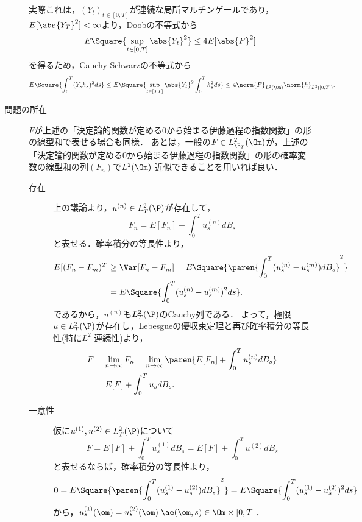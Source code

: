 \documentclass[uplatex,dvipdfmx]{jsreport}
\begin{document}
\begin{Proof}
\begin{description}
        実際これは，$(Y_t)_{t\in[0,T]}$が連続な局所マルチンゲールであり，$E[\abs{Y_T}^2]<\infty$より，Doobの不等式から
        \[E\Square{\sup_{t\in[0,T]}\abs{Y_t}^2}\le 4E[\abs{F}^2]\]
        を得るため，Cauchy-Schwarzの不等式から
        \[E\Square{\int^T_0(Y_sh_s)^2ds}\le E\Square{\sup_{t\in[0,T]}\abs{Y_t}^2\int^T_0 h_s^2ds}\le 4\norm{F}_{L^2(\Om)}\norm{h}_{L^2([0,T])}.\]
        \item[問題の所在] $F$が上述の「決定論的関数が定める$0$から始まる伊藤過程の指数関数」の形の線型和で表せる場合も同様．
        あとは，一般の$F\in L^2_{\F_T}(\Om)$が，上述の「決定論的関数が定める$0$から始まる伊藤過程の指数関数」の形の確率変数の線型和の列$(F_n)$で$L^2(\Om)$-近似できることを用いれば良い．
        \begin{description}
            \item[存在] 上の議論より，$u^{(n)}\in L^2_T(\P)$が存在して，
            \[F_n=E[F_n]+\int^T_0u_s^{(n)}dB_s\]
            と表せる．確率積分の等長性より，
            \begin{align*}
                E[(F_n-F_m)^2]&\ge\Var[F_n-F_m]=E\Square{\paren{\int^T_0(u^{(n)}_s-u^{(m)}_s)dB_s}^2}\\
                &=E\Square{\int^T_0(u^{(n)}_s-u^{(m)}_s)^2ds}.
            \end{align*}
            であるから，$u^{(n)}$も$L^2_T(\P)$のCauchy列である．
            よって，極限$u\in L^2_T(\P)$が存在し，Lebesgueの優収束定理と再び確率積分の等長性(特に$L^2$-連続性)より，
            \begin{align*}
                F&=\lim_{n\to\infty}F_n=\lim_{n\to\infty}\paren{E[F_n]+\int^T_0u_s^{(n)}dB_s}\\
                &=E[F]+\int^T_0u_sdB_s.
            \end{align*}
            \item[一意性] 仮に$u^{(1)},u^{(2)}\in L^2_T(\P)$について
            \[F=E[F]+\int^T_0u^{(1)}_sdB_s=E[F]+\int^T_0u^{(2)}dB_s\]
            と表せるならば，確率積分の等長性より，
            \[0=E\Square{\paren{\int^T_0(u^{(1)}_s-u^{(2)}_s)dB_s}^2}=E\Square{\int^T_0(u^{(1)}_s-u^{(2)}_s)^2ds}\]
            から，$u_s^{(1)}(\om)=u_s^{(2)}(\om)\;\ae(\om,s)\in\Om\times[0,T]$．
        \end{description}
    \end{description}
\end{Proof}
\end{document}
